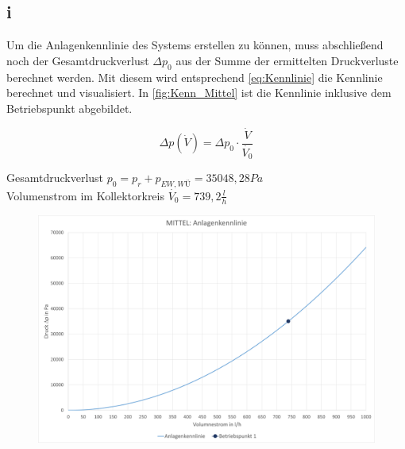 \subsection{i}
Um die Anlagenkennlinie des Systems erstellen zu können, muss abschließend noch der
Gesamtdruckverlust $\Delta p_0$ aus der Summe der ermittelten Druckverluste berechnet werden.
Mit diesem wird entsprechend \autoref{eq:Kennlinie} die Kennlinie berechnet und visualisiert.
In \autoref{fig:Kenn_Mittel} ist die Kennlinie inklusive dem Betriebspunkt abgebildet.


\begin{equation}
    \label{eq:Kennlinie}
    \Delta p (\dot{V}) = \Delta p_0  \cdot \frac{\dot{V}}{ \dot{V_0} }
\end{equation}
\vspace{\baselineskip}
\begin{center}
    Gesamtdruckverlust $p_0 =p_r + p_{EW,WÜ} = 35048,28 Pa$\\
    Volumenstrom im Kollektorkreis $\dot{V_0} = 739,2\frac{l}{h}$
\end{center}
\vspace{\baselineskip}
\begin{figure}[H]
    \centering
    \includegraphics[width=1\textwidth]{Abbildungen/Kennlinie-Mittel.png}
    \label{fig:Kenn_Mittel}
\end{figure}
